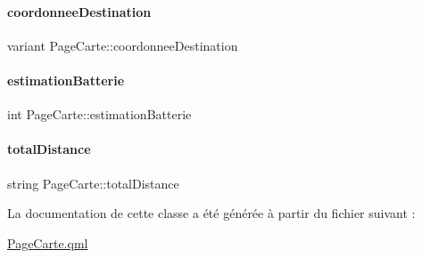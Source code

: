 \paragraph{\texorpdfstring{coordonnee\+Destination}{coordonneeDestination}}
{\footnotesize\ttfamily variant Page\+Carte\+::coordonnee\+Destination}

\mbox{\label{class_page_carte_a6881b3f806dbfe3c5d187458e57d25b9}} 
\paragraph{\texorpdfstring{estimation\+Batterie}{estimationBatterie}}
{\footnotesize\ttfamily int Page\+Carte\+::estimation\+Batterie}

\mbox{\label{class_page_carte_ac82c3aebfbfa75f8da8cd1add5b18339}} 
\paragraph{\texorpdfstring{total\+Distance}{totalDistance}}
{\footnotesize\ttfamily string Page\+Carte\+::total\+Distance}



La documentation de cette classe a été générée à partir du fichier suivant \+:\begin{DoxyCompactItemize}
\item 
\hyperlink{_page_carte_8qml}{Page\+Carte.\+qml}\end{DoxyCompactItemize}
